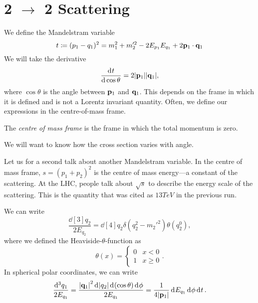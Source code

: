 \section{2 \texorpdfstring{$\to$}{to} 2 Scattering}%
\label{sec:2_$to$_to_2_scattering}

We define the Mandelstram variable 
\begin{equation}
  t \coloneqq (p_1 - q_1)^2 = m_1^2 + m_2'^2 - 2 E_{p_1} E_{q_1} + 2 \vb{p}_1 \cdot \vb{q}_1
\end{equation}
We will take the derivative 
\begin{equation}
  \dv[]{t}{\cos\theta}= 2 \abs{\vb{p}_1} \abs{\vb{q}_1},
\end{equation}
where $\cos\theta$ is the angle between $\vb{p}_1$ and $\vb{q}_1$. This depends on the frame in which it is defined and is not a Lorentz invariant quantity.
Often, we define our expressions in the centre-of-mass frame.
\begin{definition}[]
  The \emph{centre of mass frame} is the frame in which the total momentum is zero.
\end{definition}
We will want to know how the cross section varies with angle.

Let us for a second talk about another Mandelstram variable. In the centre of mass frame, $s = (p_1 + p_2)^2$ is the centre of mass energy---a constant of the scattering.
At the LHC, people talk about $\sqrt{s}$ to describe the energy scale of the scattering. This is the quantity that was cited as $13 TeV$ in the previous run.

We can write
\begin{equation}
  \frac{\dd[3]{q_2}}{2 E_{q_2}} = \dd[4]{q_2} \delta(q_2^2 -  m_2'^2) \theta(q_2^0),
\end{equation}
where we defined the Heaviside-$\theta$-function as
\begin{equation}
  \theta(x) = 
  \begin{cases}
    0 & x < 0 \\
    1 & x \geq 0
  \end{cases}.
\end{equation}
In spherical polar coordinates, we can write
\begin{equation}
  \frac{\dd[3]{q_1}}{2 E_{q_1}} = \frac{\abs{\vb{q}_1}^2 \dd[]{\abs{ q_2}} \dd[]{(\cos \theta)} \dd[]{\phi}}{2 E_{q_1}} = \frac{1}{4 \abs{\vb{p}_1}} \dd[]{E_{q_1}} \dd[]{\phi} \dd[]{t}.
\end{equation}

